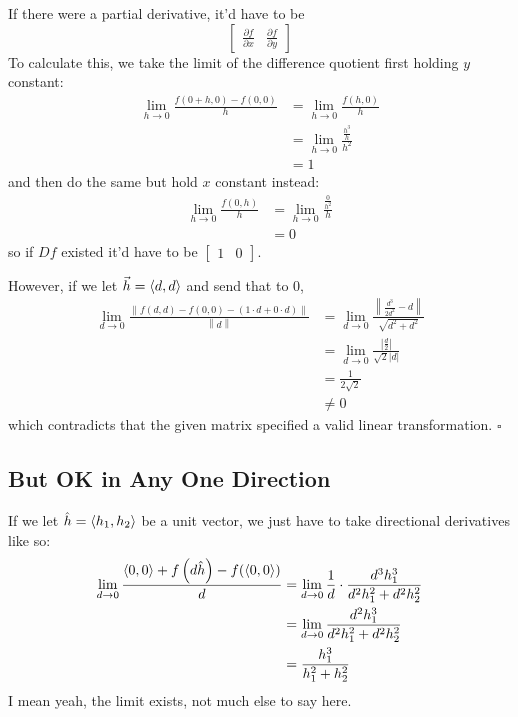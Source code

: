\documentclass[12pt]{article}
\newcommand{\norm}[1]{\left\lVert#1\right\rVert}
\begin{document}
If there were a partial derivative, it'd have to be
\[\begin{bmatrix}\frac{\partial f}{\partial x} & \frac{\partial f}{\partial y}\end{bmatrix}\]
To calculate this, we take the limit of the difference quotient first holding $y$ constant:
\begin{align*}
  \lim_{h \to 0} \frac{f(0 + h, 0)-f(0, 0)}{h}
   & = \lim_{h \to 0} \frac{f(h, 0)}{h}         \\
   & = \lim_{h \to 0} \frac{\frac{h^3}{h}}{h^2} \\
   & = 1
\end{align*}
and then do the same but hold $x$ constant instead:
\begin{align*}
  \lim_{h \to 0} \frac{f(0, h)}{h}
   & = \lim_{h \to 0} \frac{\frac{0}{h^2}}{h} \\
   & = 0
\end{align*}
so if $Df$ existed it'd have to be $\begin{bmatrix}1 & 0\end{bmatrix}$.

However, if we let $\vec{h}=\braket{d, d}$ and send that to $0$,
\begin{align*}
  \lim_{d \to 0} \frac{\norm{f(d, d)-f(0, 0)-(1 \cdot d + 0 \cdot d)}}{\norm{d}}
   & = \lim_{d \to 0} \frac{\norm{\frac{d^3}{2d^2}-d}}{\sqrt{d^2 + d^2}} \\
   & = \lim_{d \to 0} \frac{\left|\frac{d}{2}\right|}{\sqrt{2}|d|}       \\
   & = \frac{1}{2\sqrt{2}}                                               \\
   & \ne 0
\end{align*}
which contradicts that the given matrix specified a valid linear transformation. $\square$

\pagebreak

\subsection{But OK in Any One Direction}

If we let $\hat{h}=\braket{h_1, h_2}$ be a unit vector,
we just have to take directional derivatives like so:
\begin{align*}
  \lim_{d \to 0} \frac{\braket{0, 0} + f\left(d\hat{h}\right)-f(\braket{0, 0})}{d}
   & = \lim_{d \to 0} \frac{1}{d} \cdot \frac{d^3h_1^3}{d^2h_1^2+d^2h_2^2} \\
   & = \lim_{d \to 0} \frac{d^2h_1^3}{d^2h_1^2+d^2h_2^2}                   \\
   & = \frac{h_1^3}{h_1^2+h_2^2}
\end{align*}
I mean yeah, the limit exists, not much else to say here.
\end{document}
